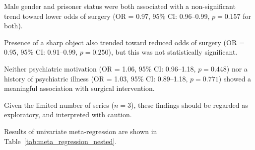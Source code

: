 Male gender and prisoner status were both associated with a non-significant trend toward lower odds of surgery (OR = 0.97, 95\% CI: 0.96--0.99, $p = 0.157$ for both).

Presence of a sharp object also trended toward reduced odds of surgery (OR = 0.95, 95\% CI: 0.91--0.99, $p = 0.250$), but this was not statistically significant. 

Neither psychiatric motivation (OR = 1.06, 95\% CI: 0.96--1.18, $p = 0.448$) nor a history of psychiatric illness (OR = 1.03, 95\% CI: 0.89--1.18, $p = 0.771$) showed a meaningful association with surgical intervention.

Given the limited number of series ($n = 3$), these findings should be regarded as exploratory, and interpreted with caution.

Results of univariate meta-regression are shown in Table~\ref{tab:meta_regression_nested}.


